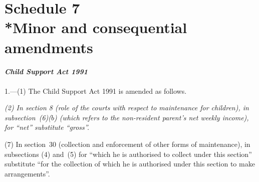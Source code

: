 \documentclass[12pt,a4paper]{article}
\begin{document}
%
%
%
%
%
%

\part[Schedule 7 --- Minor and consequential amendments]{Schedule 7\\*Minor and consequential amendments}

\renewcommand\parthead{--- Schedule 7}

\subsection*{\itshape Child Support Act 1991}

1.---(1) The Child Support Act 1991 is amended as follows.

\emph{
(2) In section 8 (role of the courts with respect to maintenance for children), in subsection~(6)($b$) (which refers to the non-resident parent's net weekly income), for “net” substitute “gross”.}


(7) In section~30 (collection and enforcement of other forms of maintenance), in subsections (4) and~(5) for “which he is authorised to collect under this section” substitute “for the collection of which he is authorised under this section to make arrangements”.
\end{document}
